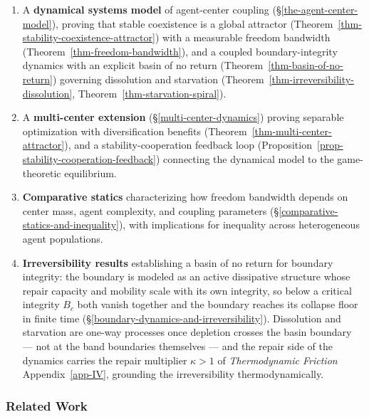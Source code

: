 \documentclass[11pt]{article}
\theoremstyle{plain}
\theoremstyle{definition}
\theoremstyle{remark}
\let\origsubsubsection\subsubsection
\renewcommand{\subsubsection}{\needspace{4\baselineskip}\origsubsubsection}
\begin{document}
\begin{enumerate}
\def\labelenumi{\arabic{enumi}.}
\item
  A \textbf{dynamical systems model} of agent-center coupling
  (§\ref{the-agent-center-model}), proving that stable coexistence is a
  global attractor (Theorem~\ref{thm-stability-coexistence-attractor})
  with a measurable freedom bandwidth
  (Theorem~\ref{thm-freedom-bandwidth}), and a coupled
  boundary-integrity dynamics with an explicit basin of no return
  (Theorem~\ref{thm-basin-of-no-return}) governing dissolution and
  starvation (Theorem~\ref{thm-irreversibility-dissolution},
  Theorem~\ref{thm-starvation-spiral}).
\item
  A \textbf{multi-center extension} (§\ref{multi-center-dynamics})
  proving separable optimization with diversification benefits
  (Theorem~\ref{thm-multi-center-attractor}), and a
  stability-cooperation feedback loop
  (Proposition~\ref{prop-stability-cooperation-feedback}) connecting the
  dynamical model to the game-theoretic equilibrium.
\item
  \textbf{Comparative statics} characterizing how freedom bandwidth
  depends on center mass, agent complexity, and coupling parameters
  (§\ref{comparative-statics-and-inequality}), with implications for
  inequality across heterogeneous agent populations.
\item
  \textbf{Irreversibility results} establishing a basin of no return for
  boundary integrity: the boundary is modeled as an active dissipative
  structure whose repair capacity and mobility scale with its own
  integrity, so below a critical integrity \(B_c\) both vanish together
  and the boundary reaches its collapse floor in finite time
  (§\ref{boundary-dynamics-and-irreversibility}). Dissolution and
  starvation are one-way processes once depletion crosses the basin
  boundary --- not at the band boundaries themselves --- and the repair
  side of the dynamics carries the repair multiplier \(\kappa > 1\) of
  \emph{Thermodynamic Friction} Appendix~\ref{app-IV}, grounding the
  irreversibility thermodynamically.
\end{enumerate}

\subsubsection{Related Work}\label{related-work-6}
\end{document}
